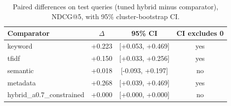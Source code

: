 \begin{table}[t]
\centering
\caption{Paired differences on test queries (tuned hybrid minus comparator), NDCG@5, with 95\% cluster-bootstrap CI.}
\label{tab:paired}
\scriptsize
\begin{tabular}{lccc}
\toprule
Comparator & $\Delta$ & 95\% CI & CI excludes 0 \\
\midrule
keyword & +0.223 & [+0.053, +0.469] & yes \\
tfidf & +0.150 & [+0.033, +0.256] & yes \\
semantic & +0.018 & [-0.093, +0.197] & no \\
metadata & +0.268 & [+0.039, +0.469] & yes \\
hybrid\_a0.7\_constrained & +0.000 & [+0.000, +0.000] & no \\
\bottomrule
\end{tabular}
\end{table}
